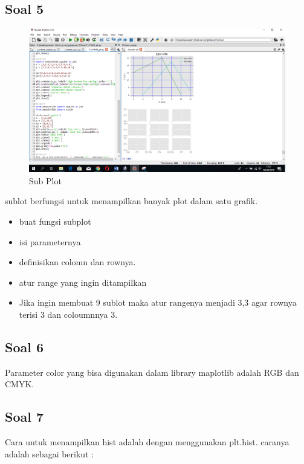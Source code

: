 \subsection{Soal 5}
\begin{figure}[h]
\centering
\includegraphics[width=20cm]{figures/6/Teori/1174095/ssub.png}
\caption{Sub Plot}
\label{Dzihan}
\end{figure}
sublot berfungsi untuk menampilkan banyak plot dalam satu grafik.
\begin{itemize}
\item buat fungsi subplot
\item isi parameternya
\item definisikan colomn dan rownya.
\item atur range yang ingin ditampilkan
\item Jika ingin membuat 9 sublot maka atur rangenya menjadi 3,3 agar rownya terisi 3 dan coloumnnya 3.
\end{itemize}
\subsection{Soal 6}
Parameter color yang bisa digunakan dalam library maplotlib adalah RGB dan CMYK.
\subsection{Soal 7}
Cara untuk menampilkan hist adalah dengan menggunakan plt.hist. caranya adalah sebagai berikut :


